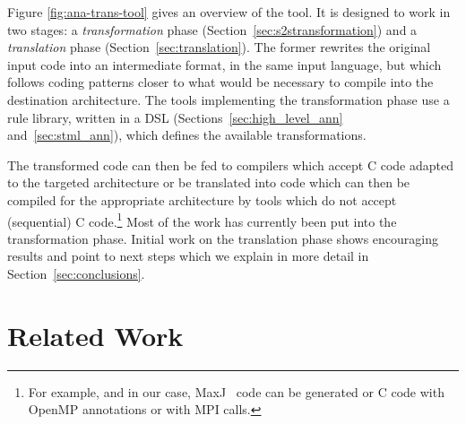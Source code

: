 \documentclass[svgnames,usenames,preprint,nocopyrightspace]{sigplanconf}
\begin{document}
\begin{figure*}
\begin{center}
  \end{center}
  \caption{Anatomy of the transformation tool.}
  \label{fig:ana-trans-tool}
 \end{figure*}


Figure \ref{fig:ana-trans-tool} gives an overview of the tool. It is
designed to work in two stages: a \emph{transformation} phase
(Section~\ref{sec:s2stransformation}) and a \emph{translation} phase 
(Section~\ref{sec:translation}).  The former rewrites the
original input code into an intermediate format, in the same input
language, but which follows coding patterns closer to what would be
necessary to compile into the destination architecture.  The tools
implementing the transformation phase use a rule library, written in a
DSL (Sections~\ref{sec:high_level_ann} and~\ref{sec:stml_ann}), which
defines the available transformations.





The transformed code can then be fed to compilers which accept C code
adapted to the targeted architecture or be translated into code which
can then be compiled for the appropriate architecture by tools which
do not accept (sequential) C code.\footnote{For example, and in our
  case, MaxJ~\cite{techologies16:max_compiler} code can be generated or C
  code with OpenMP annotations or with MPI calls. }
Most of the work has currently been put into the transformation
phase. Initial work on the translation phase shows encouraging results
and point to next steps which we explain in more detail in
Section~\ref{sec:conclusions}.









\section{Related Work}
\label{sec:related}
\end{document}
